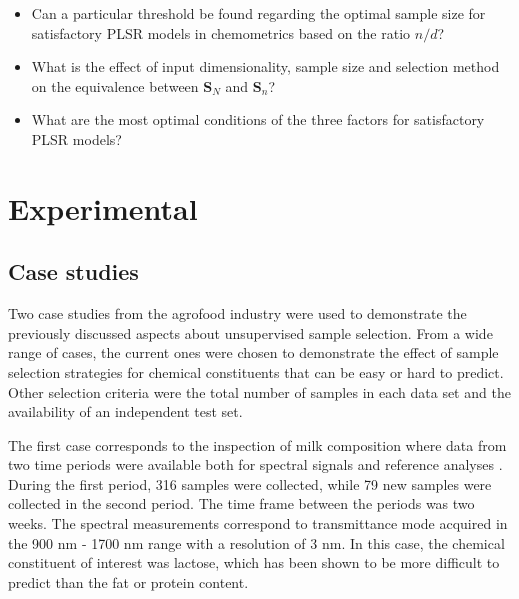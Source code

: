 \documentclass[preprint,12pt]{elsarticle}
\begin{document}
\begin{itemize}

    \item Can a particular threshold be found regarding the optimal sample size for satisfactory PLSR models in chemometrics based on the ratio $n/d$?

    \item What is the effect of input dimensionality, sample size and selection method on the equivalence between $\mathbf{S}_N$ and $\mathbf{S}_n$?
    
    \item What are the most optimal conditions of the three factors for satisfactory PLSR models?

\end{itemize}


\section{Experimental}\label{experimental}

\subsection{Case studies}\label{data}

Two case studies from the agrofood industry were used to demonstrate the previously discussed aspects about unsupervised sample selection. From a wide range of cases, the current ones were chosen to demonstrate the effect of sample selection strategies for chemical constituents that can be easy or hard to predict. Other selection criteria were the total number of samples in each data set and the availability of an independent test set. 

The first case corresponds to the inspection of milk composition where data from two time periods were available both for spectral signals and reference analyses \cite{Diaz-Olivares2020}. During the first period, 316 samples were collected, while 79 new samples were collected in the second period. The time frame between the periods was two weeks. The spectral measurements correspond to transmittance mode acquired in the 900 nm - 1700 nm range with a resolution of 3 nm. In this case, the chemical constituent of interest was lactose, which has been shown to be more difficult to predict than the fat or protein content\cite{Aernouts2011}.
\end{document}
